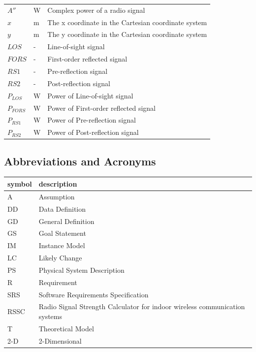 \documentclass[12pt]{article}
\begin{document}
\begin{longtable*}{l l p{12cm}}
\\
$A''$ & \si[per-mode=symbol] {\watt} & Complex power of a radio signal
\\
$x$ & \si[per-mode=symbol] {\metre} & The x coordinate in the Cartesian coordinate 
system
\\
$y$ & \si[per-mode=symbol] {\metre} & The y coordinate in the Cartesian coordinate 
system
\\
$LOS$ & \si[per-mode=symbol] {-} & Line-of-sight signal
\\
$FORS$ & \si[per-mode=symbol] {-} & First-order reflected signal
\\
$RS1$ & \si[per-mode=symbol] {-} & Pre-reflection signal
\\
$RS2$ & \si[per-mode=symbol] {-} & Post-reflection signal
\\
$P_{LOS}$ & \si[per-mode=symbol] {\watt} & Power of Line-of-sight signal
\\
$P_{FORS}$ & \si[per-mode=symbol] {\watt} & Power of First-order reflected signal
\\
$P_{RS1}$ & \si[per-mode=symbol] {\watt} & Power of Pre-reflection signal
\\
$P_{RS2}$ & \si[per-mode=symbol] {\watt} & Power of Post-reflection signal
\\
\bottomrule
\end{longtable*}

\subsection{Abbreviations and Acronyms}

\renewcommand{\arraystretch}{1.2}
\begin{tabular}{l l} 
  \toprule		
  \textbf{symbol} & \textbf{description}\\
  \midrule 
  A & Assumption\\
  DD & Data Definition\\
  GD & General Definition\\
  GS & Goal Statement\\
  IM & Instance Model\\
  LC & Likely Change\\
  PS & Physical System Description\\
  R & Requirement\\
  SRS & Software Requirements Specification\\
  RSSC & Radio Signal Strength Calculator for indoor wireless communication systems\\
  T & Theoretical Model\\
  2-D & 2-Dimensional\\
  \bottomrule
\end{tabular}\\
\end{document}
